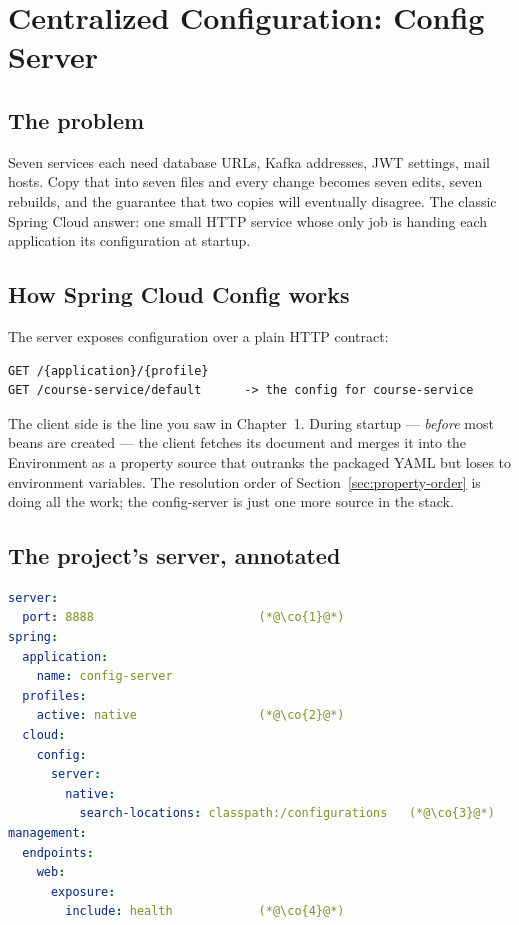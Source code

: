 \chapter{Centralized Configuration: Config Server}
\label{ch:configserver}

\section{The problem}

Seven services each need database URLs, Kafka addresses, JWT settings,
mail hosts. Copy that into seven  files and every
change becomes seven edits, seven rebuilds, and the guarantee that two
copies will eventually disagree. The classic Spring Cloud answer:
one small HTTP service whose only job is handing each application its
configuration at startup.

\section{How Spring Cloud Config works}

The server exposes configuration over a plain HTTP contract:

\begin{lstlisting}
GET /{application}/{profile}
GET /course-service/default      -> the config for course-service
\end{lstlisting}

The client side is the  
line you saw in Chapter~1. During startup --- \emph{before} most beans are
created --- the client fetches its document and merges it into the
Environment as a property source that outranks the packaged YAML but
loses to environment variables. The resolution order of
Section~\ref{sec:property-order} is doing all the work; the config-server
is just one more source in the stack.

\section{The project's server, annotated}

\begin{lstlisting}[language=yaml]
server:
  port: 8888                       (*@\co{1}@*)
spring:
  application:
    name: config-server
  profiles:
    active: native                 (*@\co{2}@*)
  cloud:
    config:
      server:
        native:
          search-locations: classpath:/configurations   (*@\co{3}@*)
management:
  endpoints:
    web:
      exposure:
        include: health            (*@\co{4}@*)
\end{lstlisting}

